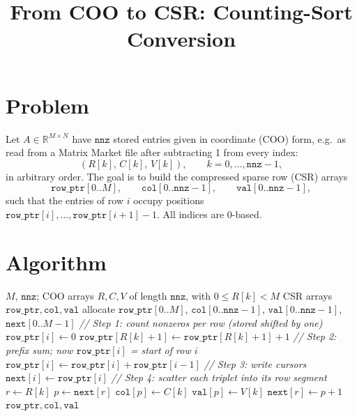 \documentclass[11pt,a4paper]{article}
\title{From COO to CSR: Counting-Sort Conversion}
\author{}
\date{}
\newcommand{\id}[1]{\texttt{#1}}
\begin{document}
\maketitle
\vspace{-1.5em}

\section{Problem}

Let $A \in \mathbb{R}^{M \times N}$ have $\id{nnz}$ stored entries given in
coordinate (COO) form, e.g.\ as read from a Matrix Market file after
subtracting 1 from every index:
\[
  (R[k],\, C[k],\, V[k]), \qquad k = 0, \dots, \id{nnz}-1,
\]
in arbitrary order. The goal is to build the compressed sparse row (CSR)
arrays
\[
  \id{row\_ptr}[0..M], \qquad \id{col}[0..\id{nnz}-1], \qquad \id{val}[0..\id{nnz}-1],
\]
such that the entries of row $i$ occupy positions
$\id{row\_ptr}[i], \dots, \id{row\_ptr}[i+1]-1$.
All indices are 0-based.

\section{Algorithm}

\begin{algorithm}[H]
\caption{COO to CSR (counting sort by row)}
\label{alg:coo2csr}
\begin{algorithmic}[1]
\Require $M$, $\id{nnz}$; COO arrays $R, C, V$ of length $\id{nnz}$, with $0 \le R[k] < M$
\Ensure CSR arrays $\id{row\_ptr}, \id{col}, \id{val}$
\Statex
\State allocate $\id{row\_ptr}[0..M]$, $\id{col}[0..\id{nnz}-1]$, $\id{val}[0..\id{nnz}-1]$, $\id{next}[0..M-1]$
\Statex \textit{// Step 1: count nonzeros per row (stored shifted by one)}
  \State $\id{row\_ptr}[i] \gets 0$
\EndFor
\For{$k \gets 0$ \textbf{to} $\id{nnz}-1$}
  \State $\id{row\_ptr}[R[k]+1] \gets \id{row\_ptr}[R[k]+1] + 1$
\EndFor
\Statex \textit{// Step 2: prefix sum; now $\id{row\_ptr}[i]$ = start of row $i$}
  \State $\id{row\_ptr}[i] \gets \id{row\_ptr}[i] + \id{row\_ptr}[i-1]$
\EndFor
\Statex \textit{// Step 3: write cursors}
  \State $\id{next}[i] \gets \id{row\_ptr}[i]$
\EndFor
\Statex \textit{// Step 4: scatter each triplet into its row segment}
\For{$k \gets 0$ \textbf{to} $\id{nnz}-1$}
  \State $r \gets R[k]$
  \State $p \gets \id{next}[r]$
  \State $\id{col}[p] \gets C[k]$
  \State $\id{val}[p] \gets V[k]$
  \State $\id{next}[r] \gets p + 1$
\EndFor
\State \Return $\id{row\_ptr}, \id{col}, \id{val}$
\end{algorithmic}
\end{algorithm}
\end{document}
